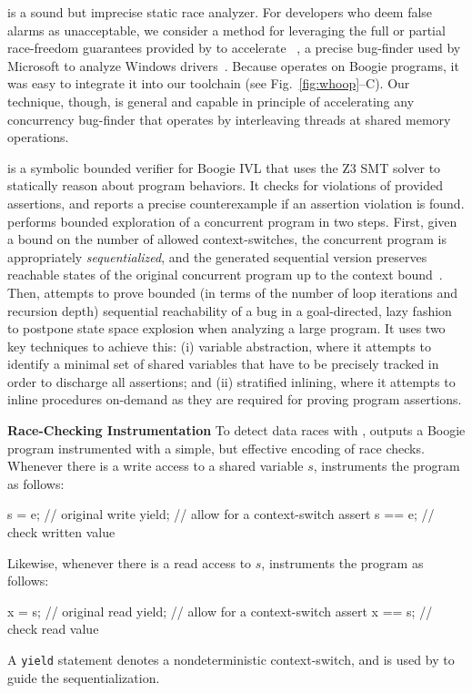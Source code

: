 \whoop is a sound but imprecise static race analyzer. For developers who deem false alarms as unacceptable, we consider a method for leveraging the full or partial race-freedom guarantees provided by \whoop to accelerate \corral~\cite{lal2012corral}, a precise bug-finder used by Microsoft to analyze Windows drivers~\cite{lal2014powering}.  Because \corral operates on Boogie programs, it was easy to integrate it into our toolchain (see Fig.~\ref{fig:whoop}--C). Our technique, though, is general and capable in principle of accelerating any concurrency bug-finder that operates by interleaving threads at shared memory operations.

\corral is a symbolic bounded verifier for Boogie IVL that uses the Z3 SMT solver to statically reason about program behaviors. It checks for violations of provided assertions, and reports a precise counterexample if an assertion violation is found. \corral performs bounded exploration of a concurrent program in two steps. First, given a bound on the number of allowed context-switches, the concurrent program is appropriately \emph{sequentialized}, and the generated sequential version preserves reachable states of the original concurrent program up to the context bound~\cite{popl2011-eqr,cav2009-lqr,cavLalR08}. Then, \corral attempts to prove bounded (in terms of the number of loop iterations and recursion depth) sequential reachability of a bug in a goal-directed, lazy fashion to postpone state space explosion when analyzing a large program. It uses two key techniques to achieve this: (i) variable abstraction, where it attempts to identify a minimal set of shared variables that have to be precisely tracked in order to discharge all assertions; and (ii) stratified inlining, where it attempts to inline procedures on-demand as they are required for proving program assertions.

\noindent\textbf{Race-Checking Instrumentation }
%
To detect data races with \corral, \whoop outputs a Boogie program instrumented with a simple, but effective encoding of race checks. Whenever there is a write access to a shared variable $s$, \whoop instruments the program as follows:
%
\begin{boogie}
s = e;         // original write
yield;         // allow for a context-switch
assert s == e; // check written value
\end{boogie}%
%
Likewise, whenever there is a read access to $s$, \whoop instruments the program as follows:
%
\begin{boogie}
x = s;         // original read
yield;         // allow for a context-switch
assert x == s; // check read value
\end{boogie}%
%
A \texttt{yield} statement denotes a nondeterministic context-switch, and is used by \corral to guide the sequentialization.

